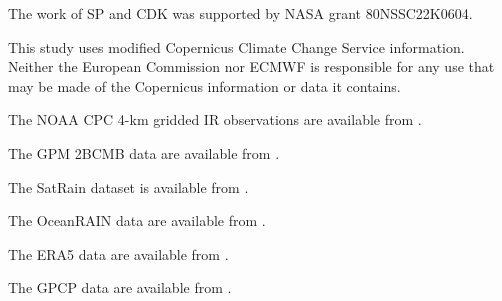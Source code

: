 \documentclass{ametsocV6.1}
\begin{document}
\clearpage
\acknowledgments

The work of SP and CDK was supported by NASA grant 80NSSC22K0604.

This study uses modified Copernicus Climate Change Service information. Neither the European Commission nor ECMWF is responsible for any use that may be made of the Copernicus information or data it contains.


\datastatement


The NOAA CPC 4-km gridded IR observations are available from \citet{ncep_cpc_mergir_v1}.

The GPM 2BCMB data are available  from \citet{cmb_data}.

The SatRain dataset is available from \citet{satrain_dataset}.

The OceanRAIN data are available from \citet{ocean_rain_data}.

The ERA5 data are available from \citet{c3s_era5_single_levels}.

The GPCP data are available from \citet{gpcp_v33_precip}.










%









\end{document}
